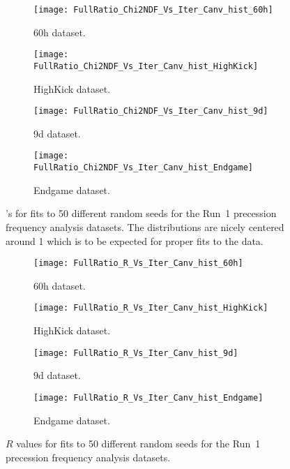 \begin{figure}[]
\centering
    \begin{subfigure}[]{0.45\textwidth}
        \centering
        \texttt{[image: FullRatio\_Chi2NDF\_Vs\_Iter\_Canv\_hist\_60h]}
        \caption{60h dataset.}
    \end{subfigure}%
    \begin{subfigure}[]{0.45\textwidth}
        \centering
        \texttt{[image: FullRatio\_Chi2NDF\_Vs\_Iter\_Canv\_hist\_HighKick]}
        \caption{HighKick dataset.}
    \end{subfigure}

    \begin{subfigure}[]{0.45\textwidth}
        \centering
        \texttt{[image: FullRatio\_Chi2NDF\_Vs\_Iter\_Canv\_hist\_9d]}
        \caption{9d dataset.}
    \end{subfigure}%
    \begin{subfigure}[]{0.45\textwidth}
        \centering
        \texttt{[image: FullRatio\_Chi2NDF\_Vs\_Iter\_Canv\_hist\_Endgame]}
        \caption{Endgame dataset.}
    \end{subfigure}
\caption[\chisq's for fits to many random seeds]{\chisq's for fits to 50 different random seeds for the Run~1 precession frequency analysis datasets. The distributions are nicely centered around 1 which is to be expected for proper fits to the data.}
\label{fig:randomSeedFits_chi2}
\end{figure}


\begin{figure}[]
\centering
    \begin{subfigure}[]{0.45\textwidth}
        \centering
        \texttt{[image: FullRatio\_R\_Vs\_Iter\_Canv\_hist\_60h]}
        \caption{60h dataset.}
    \end{subfigure}%
    \begin{subfigure}[]{0.45\textwidth}
        \centering
        \texttt{[image: FullRatio\_R\_Vs\_Iter\_Canv\_hist\_HighKick]}
        \caption{HighKick dataset.}
    \end{subfigure}

    \begin{subfigure}[]{0.45\textwidth}
        \centering
        \texttt{[image: FullRatio\_R\_Vs\_Iter\_Canv\_hist\_9d]}
        \caption{9d dataset.}
    \end{subfigure}%
    \begin{subfigure}[]{0.45\textwidth}
        \centering
        \texttt{[image: FullRatio\_R\_Vs\_Iter\_Canv\_hist\_Endgame]}
        \caption{Endgame dataset.}
    \end{subfigure}
\caption[$R$ values for fits to many random seeds]{$R$ values for fits to 50 different random seeds for the Run~1 precession frequency analysis datasets.}
\label{fig:randomSeedFits_R}
\end{figure}



